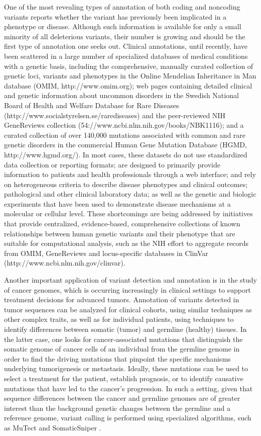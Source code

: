 One of the most revealing types of annotation of both coding and noncoding variants reports whether the variant has previously been implicated in a phenotype or disease. Although such information is available for only a small minority of all deleterious variants, their number is growing and should be the first type of annotation one seeks out. Clinical annotations, until recently, have been scattered in a large number of specialized databases of medical conditions with a genetic basis, including the comprehensive, manually curated collection of genetic loci, variants and phenotypes in the Online Mendelian Inheritance in Man database (OMIM, http://www.omim.org); web pages containing detailed clinical and genetic information about uncommon disorders in the Swedish National Board of Health and Welfare Database for Rare Diseases (http://www.socialstyrelsen.se/rarediseases) and the peer-reviewed NIH GeneReviews collection (54://www.ncbi.nlm.nih.gov/books/NBK1116); and a curated collection of over 140,000 mutations associated with common and rare genetic disorders in the commercial Human Gene Mutation Database (HGMD, http://www.hgmd.org/). In most cases, these datasets do not use standardized data collection or reporting formats; are designed to primarily provide information to patients and health professionals through a web interface; and rely on heterogeneous criteria to describe disease phenotypes and clinical outcomes; pathological and other clinical laboratory data; as well as the genetic and biologic experiments that have been used to demonstrate disease mechanisms at a molecular or cellular level. These shortcomings are being addressed by initiatives that provide centralized, evidence-based, comprehensive collections of known relationships between human genetic variants and their phenotype that are suitable for computational analysis, such as the NIH effort to aggregate records from OMIM, GeneReviews and locus-specific databases in ClinVar (http://www.ncbi.nlm.nih.gov/clinvar). 

Another important application of variant detection and annotation is in the study of cancer genomes, which is occurring increasingly in clinical settings to support treatment decisions for advanced tumors. Annotation of variants detected in tumor sequences can be analyzed for clinical cohorts, using similar techniques as other complex traits, as well as for individual patients, using techniques to identify differences between somatic (tumor) and germline (healthy) tissues. In the latter case, one looks for cancer-associated mutations that distinguish the somatic genome of cancer cells of an individual from the germline genome in order to find the driving mutations that pinpoint the specific mechanisms underlying tumorigenesis or metastasis. Ideally, these mutations can be used to select a treatment for the patient, establish prognosis, or to identify causative mutations that have led to the cancer’s progression. In such a setting, given that sequence differences between the cancer and germline genomes are of greater interest than the background genetic changes between the germline and a reference genome, variant calling is performed using specialized algorithms, such as MuTect  \cite{cibulskis2013sensitive} and SomaticSniper  \cite{larson2012somaticsniper}.

